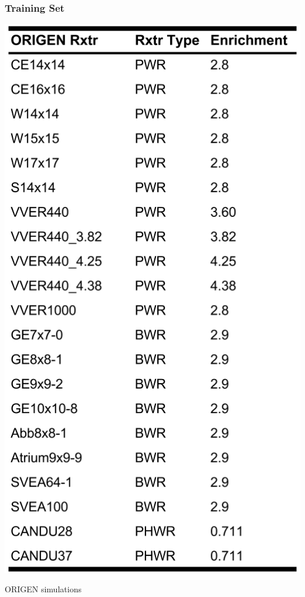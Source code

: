 
\begin{frame}
  \frametitle{Training Set}
  \begin{minipage}{0.5\textwidth}
    \begin{table}
      \centering
      \includegraphics[height=0.8\textheight]{./figures/TrainData.png}
      \caption{ORIGEN simulations \cite{dayman_feasibility_2013}}
    \end{table}

\end{minipage}
\end{frame}
